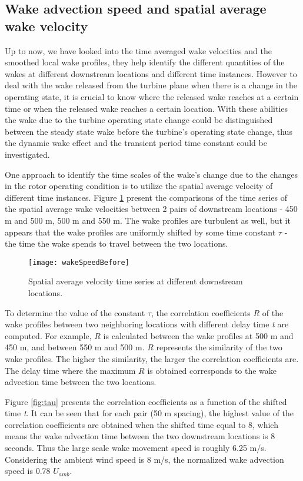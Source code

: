 \documentclass{umthesis}
\begin{document}
\subsection{Wake advection speed and spatial average wake velocity}
Up to now, we have looked into the time averaged wake velocities and the smoothed local wake profiles, they help identify the different quantities of the wakes at different downstream locations and different time instances. However to deal with the wake released from the turbine plane when there is a change in the operating state, it is crucial to know where the released wake reaches at a certain time or when the released wake reaches a certain location. With these abilities the wake due to the turbine operating state change could be distinguished between the steady state wake before the turbine's operating state change, thus the dynamic wake effect and the transient period time constant could be investigated.

One approach to identify the time scales of the wake’s change due to the changes in the rotor operating condition is to utilize the spatial average velocity of different time instances. Figure \ref{fig:wakeSpeedBefore} present the comparisons of the time series of the spatial average wake velocities between 2 pairs of downstream locations - 450 m and 500 m, 500 m and 550 m. The wake profiles are turbulent as well, but it appears that the wake profiles are uniformly shifted by some time constant $\tau$ - the time the wake spends to travel between the two locations.

\begin{figure}
  \centering
  \texttt{[image: wakeSpeedBefore]}
  \caption{Spatial average velocity time series at different downstream locations.}\label{fig:wakeSpeedBefore}
\end{figure}

To determine the value of the constant $\tau$, the correlation coefficients $R$ of the wake profiles between two neighboring locations with different delay time \textit{t} are computed. For example, $R$ is calculated between the wake profiles at 500 m and 450 m, and between 550 m and 500 m. $R$ represents the similarity of the two wake profiles. The higher the similarity, the larger the correlation coefficients are. The delay time where the maximum $R$ is obtained corresponds to the wake advection time between the two locations. 

Figure \ref{fig:tau} presents the correlation coefficients as a function of the shifted time \textit{t}. It can be seen that for each pair (50 m spacing), the highest value of the correlation coefficients are obtained when the shifted time equal to 8, which means the wake advection time between the two downstream locations is 8 seconds. Thus the large scale wake movement speed is roughly 6.25 m/s. Considering the ambient wind speed is 8 m/s, the normalized wake advection speed is 0.78 $U_{amb}$.
\end{document}
